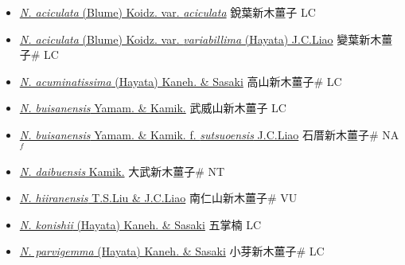 \begin{itemize}
  \begin{itemize}
        \item[] \href{http://www.theplantlist.org/tpl1.1/search?q=Neolitsea+aciculata+var.+aciculata}{\textit{N. aciculata} (Blume) Koidz. var. \textit{aciculata}}   銳葉新木薑子 LC
        \item[] \href{http://www.theplantlist.org/tpl1.1/search?q=Neolitsea+aciculata+var.+variabillima}{\textit{N. aciculata} (Blume) Koidz. var. \textit{variabillima} (Hayata) J.C.Liao}   變葉新木薑子\# LC
        \item[] \href{http://www.theplantlist.org/tpl1.1/search?q=Neolitsea+acuminatissima}{\textit{N. acuminatissima} (Hayata) Kaneh. \& Sasaki}   高山新木薑子\# LC
        \item[] \href{http://www.theplantlist.org/tpl1.1/search?q=Neolitsea+buisanensis}{\textit{N. buisanensis} Yamam. \& Kamik.}   武威山新木薑子 LC
        \item[] \href{http://www.theplantlist.org/tpl1.1/search?q=Neolitsea+buisanensis+ f. +sutsuoensis}{\textit{N. buisanensis} Yamam. \& Kamik.  f.  \textit{sutsuoensis} J.C.Liao}   石厝新木薑子\# NA $^f$
        \item[] \href{http://www.theplantlist.org/tpl1.1/search?q=Neolitsea+daibuensis}{\textit{N. daibuensis} Kamik.}   大武新木薑子\# NT
        \item[] \href{http://www.theplantlist.org/tpl1.1/search?q=Neolitsea+hiiranensis}{\textit{N. hiiranensis} T.S.Liu \& J.C.Liao}   南仁山新木薑子\# VU
        \item[] \href{http://www.theplantlist.org/tpl1.1/search?q=Neolitsea+konishii}{\textit{N. konishii} (Hayata) Kaneh. \& Sasaki}   五掌楠 LC
        \item[] \href{http://www.theplantlist.org/tpl1.1/search?q=Neolitsea+parvigemma}{\textit{N. parvigemma} (Hayata) Kaneh. \& Sasaki}   小芽新木薑子\# LC

\end{itemize}
\end{itemize}
